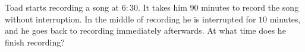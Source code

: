 Toad starts recording a song at $6{:}30$. It takes him $90$ minutes to record the song without interruption. In the middle of recording he is interrupted for $10$ minutes, and he goes back to recording immediately afterwards. At what time does he finish recording?
